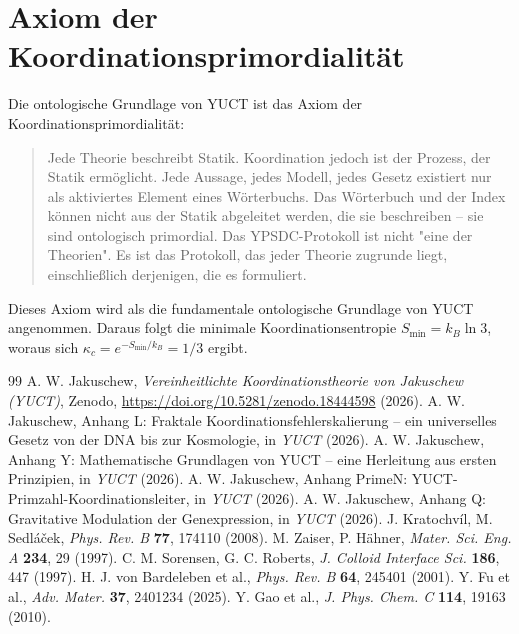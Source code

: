 \documentclass[12pt,a4paper]{article}
\begin{document}
	\section{Axiom der Koordinationsprimordialität}
	\label{app:axiom}
	Die ontologische Grundlage von YUCT ist das Axiom der Koordinationsprimordialität:
	\begin{quote}
		Jede Theorie beschreibt Statik. Koordination jedoch ist der Prozess, der Statik ermöglicht. Jede Aussage, jedes Modell, jedes Gesetz existiert nur als aktiviertes Element eines Wörterbuchs. Das Wörterbuch und der Index können nicht aus der Statik abgeleitet werden, die sie beschreiben -- sie sind ontologisch primordial. Das YPSDC-Protokoll ist nicht "eine der Theorien". Es ist das Protokoll, das jeder Theorie zugrunde liegt, einschließlich derjenigen, die es formuliert.
	\end{quote}
	Dieses Axiom wird als die fundamentale ontologische Grundlage von YUCT angenommen. Daraus folgt die minimale Koordinationsentropie \(S_{\min} = k_B \ln 3\), woraus sich \(\kappa_c = e^{-S_{\min}/k_B} = 1/3\) ergibt.
	
	\begin{thebibliography}{99}
		A. W. Jakuschew, \emph{Vereinheitlichte Koordinationstheorie von Jakuschew (YUCT)}, Zenodo, \url{https://doi.org/10.5281/zenodo.18444598} (2026).
		A. W. Jakuschew, Anhang L: Fraktale Koordinationsfehlerskalierung -- ein universelles Gesetz von der DNA bis zur Kosmologie, in \emph{YUCT} (2026).
		A. W. Jakuschew, Anhang Y: Mathematische Grundlagen von YUCT -- eine Herleitung aus ersten Prinzipien, in \emph{YUCT} (2026).
		A. W. Jakuschew, Anhang PrimeN: YUCT-Primzahl-Koordinationsleiter, in \emph{YUCT} (2026).
		A. W. Jakuschew, Anhang Q: Gravitative Modulation der Genexpression, in \emph{YUCT} (2026).
		J. Kratochv\'il, M. Sedl\'a\v{c}ek, \emph{Phys. Rev. B} \textbf{77}, 174110 (2008).
		M. Zaiser, P. H\"ahner, \emph{Mater. Sci. Eng. A} \textbf{234}, 29 (1997).
		C. M. Sorensen, G. C. Roberts, \emph{J. Colloid Interface Sci.} \textbf{186}, 447 (1997).
		H. J. von Bardeleben et al., \emph{Phys. Rev. B} \textbf{64}, 245401 (2001).
		Y. Fu et al., \emph{Adv. Mater.} \textbf{37}, 2401234 (2025).
		Y. Gao et al., \emph{J. Phys. Chem. C} \textbf{114}, 19163 (2010).
	\end{thebibliography}
	
\end{document}
